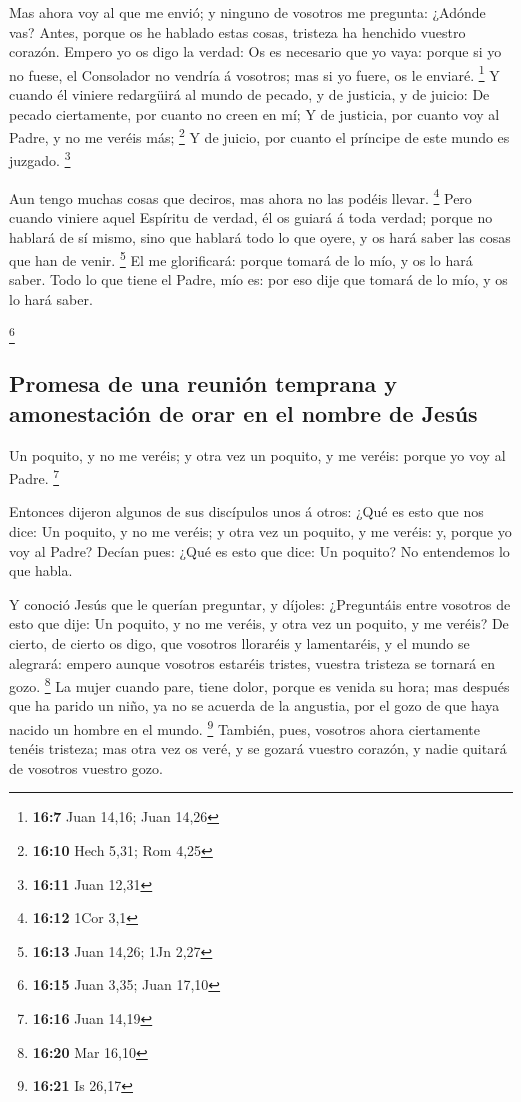  Mas ahora voy al que me envió; y ninguno de vosotros me
pregunta: ¿Adónde vas?  Antes, porque os he hablado estas
cosas, tristeza ha henchido vuestro corazón.  Empero yo os
digo la verdad: Os es necesario que yo vaya: porque si yo no fuese, el
Consolador no vendría á vosotros; mas si yo fuere, os le enviaré.
\footnote{\textbf{16:7} Juan 14,16; Juan 14,26}  Y cuando
él viniere redargüirá al mundo de pecado, y de justicia, y de juicio:
 De pecado ciertamente, por cuanto no creen en mí;
 Y de justicia, por cuanto voy al Padre, y no me veréis
más; \footnote{\textbf{16:10} Hech 5,31; Rom 4,25}  Y de
juicio, por cuanto el príncipe de este mundo es juzgado. \footnote{\textbf{16:11}
  Juan 12,31}

 Aun tengo muchas cosas que deciros, mas ahora no las
podéis llevar. \footnote{\textbf{16:12} 1Cor 3,1}  Pero
cuando viniere aquel Espíritu de verdad, él os guiará á toda verdad;
porque no hablará de sí mismo, sino que hablará todo lo que oyere, y os
hará saber las cosas que han de venir. \footnote{\textbf{16:13} Juan
  14,26; 1Jn 2,27}  El me glorificará: porque tomará de
lo mío, y os lo hará saber.  Todo lo que tiene el Padre,
mío es: por eso dije que tomará de lo mío, y os lo hará saber.

\footnote{\textbf{16:15} Juan 3,35; Juan 17,10}

\hypertarget{promesa-de-una-reuniuxf3n-temprana-y-amonestaciuxf3n-de-orar-en-el-nombre-de-jesuxfas}{%
\subsection{Promesa de una reunión temprana y amonestación de orar en el
nombre de
Jesús}\label{promesa-de-una-reuniuxf3n-temprana-y-amonestaciuxf3n-de-orar-en-el-nombre-de-jesuxfas}}

 Un poquito, y no me veréis; y otra vez un poquito, y me
veréis: porque yo voy al Padre. \footnote{\textbf{16:16} Juan 14,19}

 Entonces dijeron algunos de sus discípulos unos á otros:
¿Qué es esto que nos dice: Un poquito, y no me veréis; y otra vez un
poquito, y me veréis: y, porque yo voy al Padre?  Decían
pues: ¿Qué es esto que dice: Un poquito? No entendemos lo que habla.

 Y conoció Jesús que le querían preguntar, y díjoles:
¿Preguntáis entre vosotros de esto que dije: Un poquito, y no me veréis,
y otra vez un poquito, y me veréis?  De cierto, de cierto
os digo, que vosotros lloraréis y lamentaréis, y el mundo se alegrará:
empero aunque vosotros estaréis tristes, vuestra tristeza se tornará en
gozo. \footnote{\textbf{16:20} Mar 16,10}  La mujer
cuando pare, tiene dolor, porque es venida su hora; mas después que ha
parido un niño, ya no se acuerda de la angustia, por el gozo de que haya
nacido un hombre en el mundo. \footnote{\textbf{16:21} Is 26,17}
 También, pues, vosotros ahora ciertamente tenéis
tristeza; mas otra vez os veré, y se gozará vuestro corazón, y nadie
quitará de vosotros vuestro gozo.

